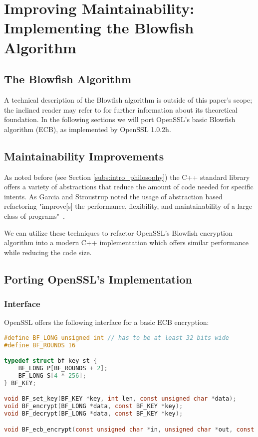 \section{Improving Maintainability: Implementing the Blowfish Algorithm}

\subsection{The Blowfish Algorithm}
A technical description of the Blowfish algorithm is outside of this paper's scope; the inclined reader may refer to \cite{blowfish} for further information about its theoretical foundation. In the following sections we will port OpenSSL's basic Blowfish algorithm (ECB), as implemented by OpenSSL 1.0.2h. %

\subsection{Maintainability Improvements}

As noted before (see Section \ref{subs:intro_philosophy}) the C++ standard library offers a variety of abstractions that reduce the amount of code needed for specific intents. As Garcia and Stroustrup noted the usage of abstraction based refactoring "improve[s] the performance, flexibility, and maintainability of a large class of programs"~\cite{impperf}.

We can utilize these techniques to refactor OpenSSL's Blowfish encryption algorithm into a modern C++ implementation which offers similar performance while reducing the code size.

\subsection{Porting OpenSSL's Implementation}

\subsubsection{Interface}\label{subsub:bf_interface}

OpenSSL offers the following interface for a basic ECB encryption:

\begin{lstlisting}[language=C]
#define BF_LONG unsigned int // has to be at least 32 bits wide
#define BF_ROUNDS 16

typedef struct bf_key_st {
    BF_LONG P[BF_ROUNDS + 2];
    BF_LONG S[4 * 256];
} BF_KEY;

void BF_set_key(BF_KEY *key, int len, const unsigned char *data);
void BF_encrypt(BF_LONG *data, const BF_KEY *key);
void BF_decrypt(BF_LONG *data, const BF_KEY *key);

void BF_ecb_encrypt(const unsigned char *in, unsigned char *out, const BF_KEY *key, int enc);
\end{lstlisting}

